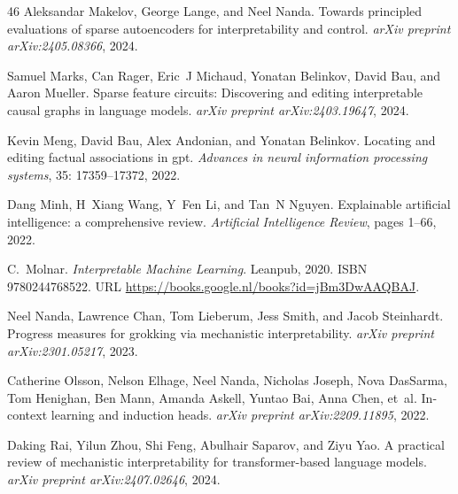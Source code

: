 \begin{thebibliography}{46}
Aleksandar Makelov, George Lange, and Neel Nanda.
\newblock Towards principled evaluations of sparse autoencoders for interpretability and control.
\newblock \emph{arXiv preprint arXiv:2405.08366}, 2024.

Samuel Marks, Can Rager, Eric~J Michaud, Yonatan Belinkov, David Bau, and Aaron Mueller.
\newblock Sparse feature circuits: Discovering and editing interpretable causal graphs in language models.
\newblock \emph{arXiv preprint arXiv:2403.19647}, 2024.

Kevin Meng, David Bau, Alex Andonian, and Yonatan Belinkov.
\newblock Locating and editing factual associations in gpt.
\newblock \emph{Advances in neural information processing systems}, 35: 17359--17372, 2022.

Dang Minh, H~Xiang Wang, Y~Fen Li, and Tan~N Nguyen.
\newblock Explainable artificial intelligence: a comprehensive review.
\newblock \emph{Artificial Intelligence Review}, pages 1--66, 2022.

C.~Molnar.
\newblock \emph{Interpretable Machine Learning}.
\newblock Leanpub, 2020.
\newblock ISBN 9780244768522.
\newblock URL \url{https://books.google.nl/books?id=jBm3DwAAQBAJ}.

Neel Nanda, Lawrence Chan, Tom Lieberum, Jess Smith, and Jacob Steinhardt.
\newblock Progress measures for grokking via mechanistic interpretability.
\newblock \emph{arXiv preprint arXiv:2301.05217}, 2023.

Catherine Olsson, Nelson Elhage, Neel Nanda, Nicholas Joseph, Nova DasSarma, Tom Henighan, Ben Mann, Amanda Askell, Yuntao Bai, Anna Chen, et~al.
\newblock In-context learning and induction heads.
\newblock \emph{arXiv preprint arXiv:2209.11895}, 2022.

Daking Rai, Yilun Zhou, Shi Feng, Abulhair Saparov, and Ziyu Yao.
\newblock A practical review of mechanistic interpretability for transformer-based language models.
\newblock \emph{arXiv preprint arXiv:2407.02646}, 2024.


\end{thebibliography}
